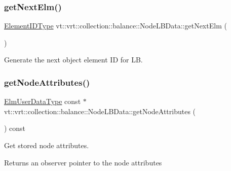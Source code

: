 \subsubsection{\texorpdfstring{get\+Next\+Elm()}{getNextElm()}}
{\footnotesize\ttfamily \hyperlink{namespacevt_1_1vrt_1_1collection_1_1balance_a592736f733df4f90856df90a1fd08905}{Element\+I\+D\+Type} vt\+::vrt\+::collection\+::balance\+::\+Node\+L\+B\+Data\+::get\+Next\+Elm (\begin{DoxyParamCaption}{ }\end{DoxyParamCaption})}



Generate the next object element ID for LB. 

\mbox{\label{structvt_1_1vrt_1_1collection_1_1balance_1_1_node_l_b_data_a567dfeef1d927e928f492ae6e744bc62}} 
\subsubsection{\texorpdfstring{get\+Node\+Attributes()}{getNodeAttributes()}}
{\footnotesize\ttfamily \hyperlink{namespacevt_1_1vrt_1_1collection_1_1balance_abf9eea0f4c24e41036ab844025e7d4c8}{Elm\+User\+Data\+Type} const  $\ast$ vt\+::vrt\+::collection\+::balance\+::\+Node\+L\+B\+Data\+::get\+Node\+Attributes (\begin{DoxyParamCaption}{ }\end{DoxyParamCaption}) const}



Get stored node attributes. 

\begin{DoxyReturn}{Returns}
an observer pointer to the node attributes 
\end{DoxyReturn}
\mbox{\label{structvt_1_1vrt_1_1collection_1_1balance_1_1_node_l_b_data_a01ac3980585c93769570fd4e76ea9218}} 
